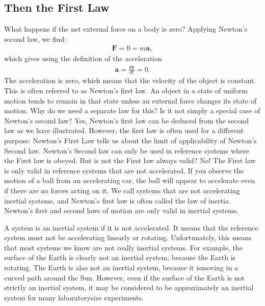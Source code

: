 \documentclass[letterpaper,10pt,english]{sphinxmanual}
\begin{document}
\subsection{Then the First Law}
\label{\detokenize{chapter3:then-the-first-law}}
What happens if the net external force on a body is zero? Applying Newton’s second
law, we find:
\begin{equation*}
\begin{split}
\boldsymbol{F} = 0 = m\boldsymbol{a},
\end{split}
\end{equation*}
which gives using the definition of the acceleration
\begin{equation*}
\begin{split}
\boldsymbol{a} = \frac{d\boldsymbol{v}}{dt}=0.
\end{split}
\end{equation*}
The acceleration is zero, which means that the velocity of the object is constant. This
is often referred to as Newton’s first law. An object in a state of uniform motion tends to remain in
that state unless an external force changes its state of motion.
Why do we need a separate law for this? Is it not simply a special case of Newton’s
second law? Yes, Newton’s first law can be deduced from the second law as we have
illustrated. However, the first law is often used for a different purpose: Newton’s
First Law tells us about the limit of applicability of Newton’s Second law. Newton’s
Second law can only be used in reference systems where the First law is obeyed. But
is not the First law always valid? No! The First law is only valid in reference systems
that are not accelerated. If you observe the motion of a ball from an accelerating
car, the ball will appear to accelerate even if there are no forces acting on it. We call
systems that are not accelerating inertial systems, and Newton’s first law is often
called the law of inertia. Newton’s first and second laws of motion are only valid in
inertial systems.

A system is an inertial system if it is not accelerated. It means that the reference system
must not be accelerating linearly or rotating. Unfortunately, this means that most
systems we know are not really inertial systems. For example, the surface of the
Earth is clearly not an inertial system, because the Earth is rotating. The Earth is also
not an inertial system, because it ismoving in a curved path around the Sun. However,
even if the surface of the Earth is not strictly an inertial system, it may be considered
to be approximately an inertial system for many laboratory\sphinxhyphen{}size experiments.
\end{document}
